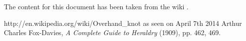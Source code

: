 \documentclass[a4paper,12pt]{article}
\begin{document}
The content for this document has been taken from the wiki \cite{wiki}.

\begin{thebibliography}{99}
 http://en.wikipedia.org/wiki/Overhand\_knot as seen on April 7th 
2014
 Arthur Charles Fox-Davies, \emph{A Complete Guide to 
Heraldry} (1909), pp. 462, 469.
\end{thebibliography}
\end{document}
